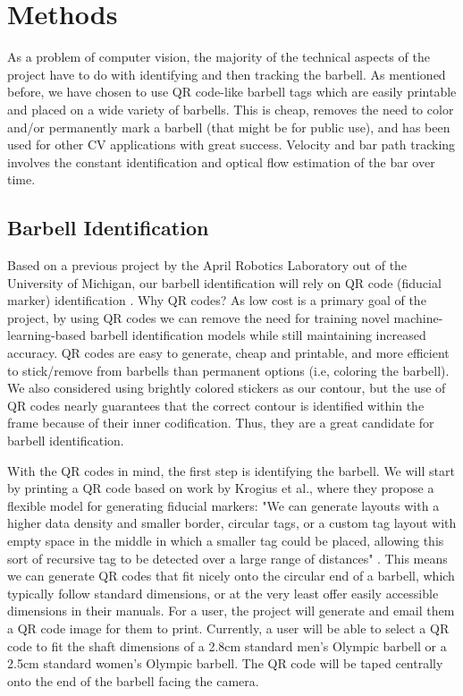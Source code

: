 \documentclass[10pt,twocolumn]{article}
\begin{document}
\section{Methods}
As a problem of computer vision, the majority of the technical aspects of the project have to do with identifying and then tracking the barbell.
As mentioned before, we have chosen to use QR code-like barbell tags which are easily printable and placed on a wide variety of barbells. 
This is cheap, removes the need to color and/or permanently mark a barbell (that might be for public use), and has been used for other CV applications with great success. 
Velocity and bar path tracking involves the constant identification and optical flow estimation of the bar over time.

\subsection{Barbell Identification}
Based on a previous project by the April Robotics Laboratory out of the University of Michigan, our barbell identification will rely on QR code (fiducial marker) identification \cite{Wang2016}. 
Why QR codes? 
As low cost is a primary goal of the project, by using QR codes we can remove the need for training novel machine-learning-based barbell identification models while still maintaining increased accuracy. 
QR codes are easy to generate, cheap and printable, and more efficient to stick/remove from barbells than permanent options (i.e, coloring the barbell). 
We also considered using brightly colored stickers as our contour, but the use of QR codes nearly guarantees that the correct contour is identified within the frame because of their inner codification.
Thus, they are a great candidate for barbell identification. \par

With the QR codes in mind, the first step is identifying the barbell. 
We will start by printing a QR code based on work by Krogius et al., where they propose a flexible model for generating fiducial markers: 
"We can generate layouts with a higher data density and smaller border, circular tags, or a custom tag layout with empty space in the middle in which a smaller tag could be placed, allowing this sort of recursive tag to be detected over a large range of distances" \cite{Krogius2019}.
This means we can generate QR codes that fit nicely onto the circular end of a barbell, which typically follow standard dimensions, or at the very least offer easily accessible dimensions in their manuals.
For a user, the project will generate and email them a QR code image for them to print.
Currently, a user will be able to select a QR code to fit the shaft dimensions of a 2.8cm standard men's Olympic barbell or a 2.5cm standard women's Olympic barbell.
The QR code will be taped centrally onto the end of the barbell facing the camera.\par
\end{document}
